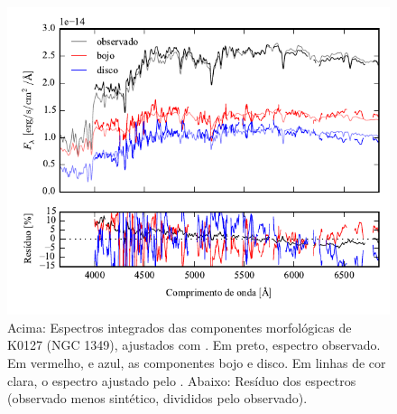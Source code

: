 \begin{figure}
	\includegraphics[page=3]{figuras/sample006a_synthesis}
	\caption[Espectros ajustados com \starlight das componentes morfológicas de
	K0127 (NGC 1349)]
	{Acima: Espectros integrados das componentes morfológicas de
	K0127 (NGC 1349), ajustados com \starlight. Em preto, espectro observado. Em
	vermelho, e azul, as componentes bojo e disco. Em linhas de cor clara, o
	espectro ajustado pelo \starlight. Abaixo: Resíduo dos espectros (observado
	menos sintético, divididos pelo observado).}
	\label{fig:decompSintese:K0127}
\end{figure}

